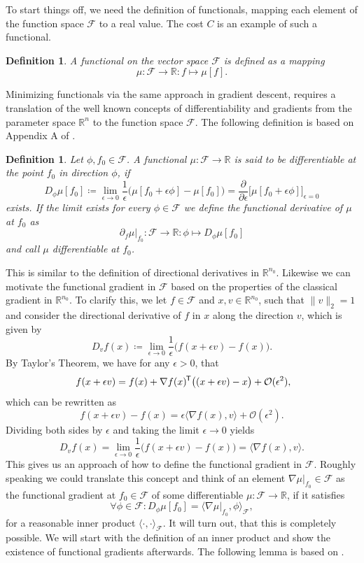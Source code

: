 \documentclass[11pt, a4paper]{article}
\newtheorem{definition}[theorem]{Definition}
\newcommand{\R}{\mathbb{R}}
\newcommand{\F}{\mathcal{F}}
\renewcommand{\O}{\mathcal{O}}
\newcommand*{\tr}{^{\mkern-1.5mu\mathsf{T}}}
\begin{document}
To start things off, we need the definition of functionals, mapping each element of the function space $\F$ to a real value. The cost $C$ is an example of such a functional.

\begin{definition}
A functional on the vector space $\F$ is defined as a mapping
\[ \mu: \F \to \R : f \mapsto \mu[f]. \]
\end{definition}

Minimizing functionals via the same approach in gradient descent, requires a translation of the well known concepts of differentiability and gradients from the parameter space $\R^n$ to the function space $\F$. The following definition is based on Appendix A of \cite{Functionals}.

\begin{definition}
Let $\phi, f_0 \in \F$. A functional $\mu : \F \to \R$ is said to be differentiable at the point $f_0$ in direction $\phi$, if
\[ D_\phi\mu[f_0] \coloneq \lim_{\epsilon \to 0} \frac{1}{\epsilon} \Big ( \mu[f_0 + \epsilon \phi] - \mu[f_0] \Big ) = \frac{\partial}{\partial \epsilon} \Big [ \mu[f_0+\epsilon \phi] \Big ]_{\epsilon=0} \]
exists. If the limit exists for every $\phi \in \F$ we define the functional derivative of $\mu$ at $f_0$ as
\[ \partial_{f} \mu |_{f_0} : \F \to \R : \phi \mapsto D_\phi\mu[f_0] \]
and call $\mu$ differentiable at $f_0$.
\end{definition}

This is similar to the definition of directional derivatives in $\R^{n_0}$. Likewise we can motivate the functional gradient in $\F$ based on the properties of the classical gradient in $\R^{n_0}$. To clarify this, we let $f \in \F$ and $x,v \in \R^{n_0}$, such that $\| v \|_2 = 1$ and consider the directional derivative of $f$ in $x$ along the direction $v$, which is given by
\[ D_vf(x) \coloneq \lim_{\epsilon \to 0} \frac{1}{\epsilon} \Big ( f(x + \epsilon v) - f(x) \Big ). \]
By Taylor's Theorem, we have for any $\epsilon > 0$, that 
\[ f(x+\epsilon v) = f(x) + \nabla f(x) \tr \big ((x + \epsilon v) - x \big ) + \O(\epsilon^2), \]
which can be rewritten as
\[ f(x + \epsilon v ) - f(x) = \epsilon \big \langle \nabla f(x), v \big \rangle + \O (\epsilon^2). \]
Dividing both sides by $\epsilon$ and taking the limit $\epsilon \to 0$ yields
\[ D_vf(x) =  \lim_{\epsilon \to 0} \frac{1}{\epsilon} \Big ( f(x + \epsilon v) - f(x) \Big ) = \big \langle \nabla f(x), v \big \rangle. \]
This gives us an approach of how to define the functional gradient in $\F$. Roughly speaking we could translate this concept and think of an element $\nabla \mu |_{f_0} \in \F $ as the functional gradient at $f_0 \in \F$ of some differentiable $\mu: \F \to \R$, if it satisfies
\[ \forall \phi \in \F : D_\phi\mu[f_0] = \big \langle \nabla \mu |_{f_0}, \phi \big \rangle_\F, \]
for a reasonable inner product $\langle \cdot, \cdot \rangle_\F$. It will turn out, that this is completely possible. We will start with the definition of an inner product and show the existence of functional gradients afterwards. The following lemma is based on \cite{NTK}.
\end{document}
